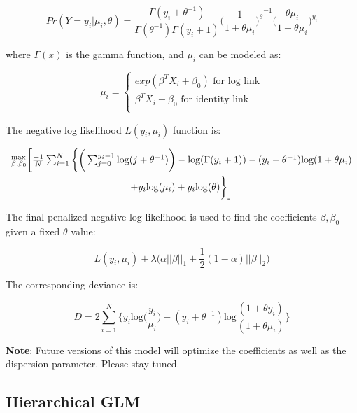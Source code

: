 $$Pr(Y = y_i|\mu_i, \theta) = \frac{\Gamma(y_i+\theta^{-1})}{\Gamma(\theta^{-1})\Gamma(y_i+1)} {\bigg(\frac {1} {1 + {\theta {\mu_i}}}\bigg) ^\theta}^{-1} { \bigg(\frac {{\theta {\mu_i}}} {1 + {\theta {\mu_i}}} \bigg) ^{y_i}}$$

where $\Gamma(x)$ is the gamma function, and $\mu_i$ can be modeled as:

$$ \mu_i=\left\{
                \begin{array}{ll}
                  exp (\beta^T X_i + \beta_0) \text{  for log link}\\
                  \beta^T X_i + \beta_0 \text{  for identity link}\\
                \end{array}
              \right. $$

The  negative log likelihood $L(y_i,\mu_i)$ function is:

\begin{multline*}
$$^\text{max}_{\beta,\beta_0} \bigg[ \frac{-1}{N} \sum_{i=1}^{N}  \bigg \{ \bigg( \sum_{j=0}^{y_i-1} \text{log}(j + \theta^{-1} ) \bigg) - \text{log} (\Gamma (y_i + 1)) - (y_i + \theta^{-1}) \text{log} (1 + \theta\mu_i) \\ + y_i \text{log}(\mu_i) + y_i \text{log} (\theta) \bigg \} \bigg]$$
\end{multline*}

The final penalized negative log likelihood is used to find the coefficients $\beta, \beta_0$ given a fixed $\theta$ value:

$$ L(y_i, \mu_i) + \lambda \big(\alpha || \beta || _1 + \frac{1}{2} (1 - \alpha) || \beta || _2 \big)$$

The corresponding deviance is:

$$D = 2 \sum_{i=1}^{N} \bigg \{ y_i \text{log} \big(\frac{y_i}{\mu_i} \big) - (y_i + \theta^{-1}) \text{log} \frac{(1+\theta y_i)}{(1+\theta \mu_i)} \bigg \}$$

\textbf{Note}: Future versions of this model will optimize the coefficients as well as the dispersion parameter. Please stay tuned.

\newpage
\waterExampleInR


\waterExampleInPython


\subsection{Hierarchical GLM}

